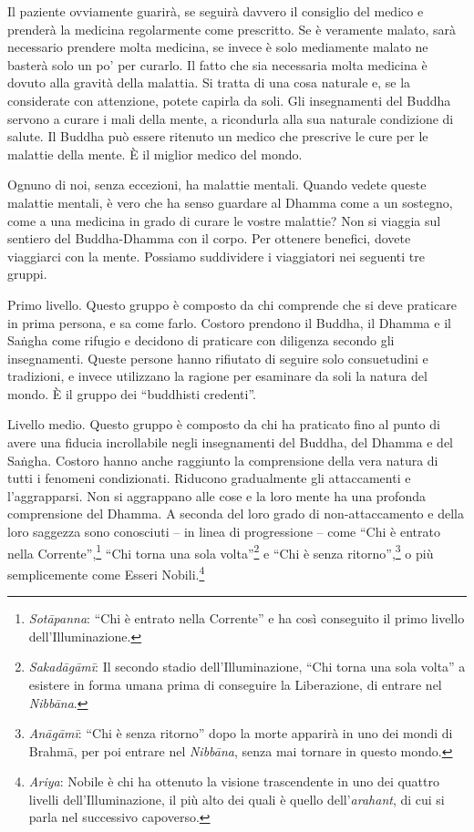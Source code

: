 Il paziente ovviamente guarirà, se seguirà davvero il consiglio del
medico e prenderà la medicina regolarmente come prescritto. Se è
veramente malato, sarà necessario prendere molta medicina, se invece è
solo mediamente malato ne basterà solo un po' per curarlo. Il fatto che
sia necessaria molta medicina è dovuto alla gravità della malattia. Si
tratta di una cosa naturale e, se la considerate con attenzione, potete
capirla da soli. Gli insegnamenti del Buddha servono a curare i mali
della mente, a ricondurla alla sua naturale condizione di salute. Il
Buddha può essere ritenuto un medico che prescrive le cure per le
malattie della mente. È il miglior medico del mondo.

Ognuno di noi, senza eccezioni, ha malattie mentali. Quando vedete
queste malattie mentali, è vero che ha senso guardare al Dhamma come a
un sostegno, come a una medicina in grado di curare le vostre malattie?
Non si viaggia sul sentiero del Buddha-Dhamma con il corpo. Per ottenere
benefici, dovete viaggiarci con la mente. Possiamo suddividere i
viaggiatori nei seguenti tre gruppi.

Primo livello. Questo gruppo è composto da chi comprende che si deve
praticare in prima persona, e sa come farlo. Costoro prendono il Buddha,
il Dhamma e il Saṅgha come rifugio e decidono di praticare con diligenza
secondo gli insegnamenti. Queste persone hanno rifiutato di seguire solo
consuetudini e tradizioni, e invece utilizzano la ragione per esaminare
da soli la natura del mondo. È il gruppo dei ``buddhisti credenti''.

Livello medio. Questo gruppo è composto da chi ha praticato fino al
punto di avere una fiducia incrollabile negli insegnamenti del Buddha,
del Dhamma e del Saṅgha. Costoro hanno anche raggiunto la comprensione
della vera natura di tutti i fenomeni condizionati. Riducono
gradualmente gli attaccamenti e l'aggrapparsi. Non si aggrappano alle
cose e la loro mente ha una profonda comprensione del Dhamma. A seconda
del loro grado di non-attaccamento e della loro saggezza sono conosciuti
-- in linea di progressione -- come ``Chi è entrato nella
Corrente'',\footnote{\emph{Sotāpanna}: ``Chi è entrato nella Corrente''
  e ha così conseguito il primo livello dell'Illuminazione.} ``Chi torna
una sola volta''\footnote{\emph{Sakadāgāmī}: Il secondo stadio
  dell'Illuminazione, ``Chi torna una sola volta'' a esistere in forma
  umana prima di conseguire la Liberazione, di entrare nel
  \emph{Nibbāna}.} e ``Chi è senza ritorno'',\footnote{\emph{Anāgāmī}:
  ``Chi è senza ritorno'' dopo la morte apparirà in uno dei mondi di
  Brahmā, per poi entrare nel \emph{Nibbāna}, senza mai tornare in
  questo mondo.} o più semplicemente come Esseri Nobili.\footnote{\emph{Ariya}:
  Nobile è chi ha ottenuto la visione trascendente in uno dei quattro
  livelli dell'Illuminazione, il più alto dei quali è quello
  dell'\emph{arahant}, di cui si parla nel successivo capoverso.}

